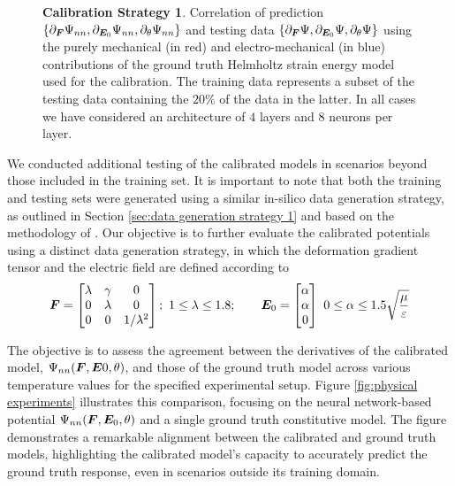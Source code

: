 \begin{figure}[hbtp!]
\begin{tabular}{cccc}
%
%
	\end{tabular}
	\caption{\textbf{Calibration Strategy 1}. Correlation of prediction $\{\partial_{\boldsymbol{F}}\Psi_{nn},\partial_{\boldsymbol{E}_0}\Psi_{nn},\partial_{\theta}\Psi_{nn}\}$ and testing data $\{\partial_{\boldsymbol{F}}\Psi,\partial_{\boldsymbol{E}_0}\Psi,\partial_{\theta}\Psi\}$ using the purely mechanical (in red) and electro-mechanical (in blue) contributions of the ground truth Helmholtz strain energy model used for the calibration. The training data represents a subset of the testing data containing the $20\%$ of the data in the latter. In all cases we have considered an architecture of $4$ layers and $8$ neurons per layer.}
	\label{fig:correlation strategy 1}
\end{figure}

















We conducted additional testing of the calibrated models in scenarios beyond those included in the training set. It is important to note that both the training and testing sets were generated using a similar in-silico data generation strategy, as outlined in Section \ref{sec:data generation strategy 1} and based on the methodology of \cite{OKunc_19_01}. Our objective is to further evaluate the calibrated potentials using a distinct data generation strategy, in which the deformation gradient tensor and the electric field are defined according to
%
\begin{equation}\label{eqn:experiments}
	\boldsymbol{F}=\begin{bmatrix}
		\lambda & \gamma & 0\\
		0&\lambda & 0\\
		0  &  0 & 1/\lambda^2
	\end{bmatrix};\,\,1\leq \lambda \leq 1.8; \qquad \boldsymbol{E}_0 =  \begin{bmatrix}
	\alpha  \\  \alpha  \\  0
\end{bmatrix}\,\,0\leq \alpha\leq 1.5\sqrt{\frac{\mu}{\varepsilon}}
\end{equation}

The objective is to assess the agreement between the derivatives of the calibrated model, $\Psi_{nn}(\boldsymbol{F}, \boldsymbol{E}0, \theta)$, and those of the ground truth model across various temperature values for the specified experimental setup. Figure \ref{fig:physical experiments} illustrates this comparison, focusing on the neural network-based potential $\Psi_{nn}(\boldsymbol{F}, \boldsymbol{E}_0, \theta)$ and a single ground truth constitutive model. The figure demonstrates a remarkable alignment between the calibrated and ground truth models, highlighting the calibrated model's capacity to accurately predict the ground truth response, even in scenarios outside its training domain.



